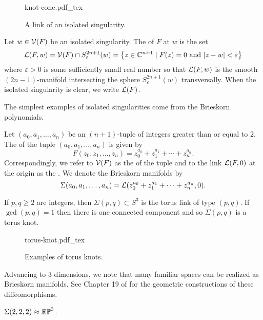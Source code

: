 \begin{figure}[ht]
  {knot-cone.pdf_tex}
  \caption{A link of an isolated singularity.}\label{fig:cone-over-knot}
\end{figure}

\begin{definition}
	Let $w\in \mathcal{V}(F)$ be an isolated singularity. The  of $F$ at $w$ is the set 
	\[
		\mathcal{L}(F, w) = \mathcal{V}(F) \cap S^{2n+1}_\varepsilon(w) = \left\{ z\in \mathbb{C}^{n+1}  \mid F(z)=0\textrm{ and } |z-w|<\varepsilon\right\}
	\]
	where $\varepsilon > 0$ is some sufficiently small real number so that $\mathcal{L}(F,w)$ is the smooth $(2n-1)$-manifold intersecting the sphere $S^{2n+1}_\varepsilon(w)$ transversally. When the isolated singularity is clear, we write $\mathcal{L}(F)$.
\end{definition}

The simplest examples of isolated singularities come from the Brieskorn polynomials.

\begin{definition}
	Let $(a_0,a_1,\ldots, a_n)$ be an $(n+1)$-tuple of integers greater than or equal to $2$. The  of the tuple $(a_0,a_1,\ldots, a_n)$ is given by
	\[
		F(z_0,z_1,\ldots, z_n) = z_0^{a_0} + z_1^{a_1} +\cdots + z_n^{a_n}.
	\]
	Correspondingly, we refer to $\mathcal{V}(F)$ as the  of the tuple and to the link $\mathcal{L}(F,0)$ at the origin as the . We denote the Brieskorn manifolds by
	\[
		\Sigma(a_0,a_1,\ldots, a_n) =\mathcal{L}(z_0^{a_0}+z_1^{a_1}+\cdots+z_n^{a_n}, 0).
	\]
\end{definition}

\begin{example}
	If $p,q\geq 2$ are integers, then $\Sigma(p,q)\subset S^3$ is the torus link of type $(p,q)$. If $\gcd(p,q)=1$ then there is one connected component and so $\Sigma(p,q)$ is a torus knot.

	\begin{figure}[ht]
		\centering
  	{torus-knot.pdf_tex}
  	\caption{Examples of torus knots.}\label{fig:torus-knots}
	\end{figure}
\end{example}

Advancing to $3$ dimensions, we note that many familiar spaces can be realized as Brieskorn manifolds. See Chapter 19 of \cite{kauffman1987knots} for the geometric constructions of these diffeomorphisms.
\begin{proposition}
	$\Sigma(2,2,2)\approx \mathbb{RP}^3$.
\end{proposition}

